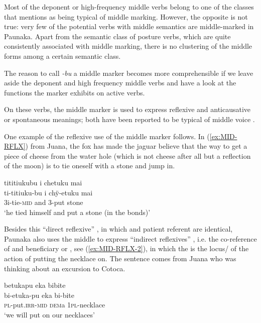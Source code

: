 Most of the deponent or high-frequency middle verbs belong to one of the classes that \citet[]{Kemmer1993} mentions as being typical of middle marking. However, the opposite is not true: very few of the potential verbs with middle semantics are middle-marked in Paunaka. Apart from the semantic class of posture verbs, which are quite consistently associated with middle marking, there is no clustering of the middle forms among a certain semantic class. 

The reason to call \textit{-bu} a middle marker becomes more comprehensible if we leave aside the deponent and high frequency middle verbs and have a look at the functions the marker exhibits on active  verbs.

On these verbs, the middle marker is used to express reflexive and anticausative or spontaneous meanings; both have been reported to be typical of middle voice \citep[cf.][1149--1150]{Shibatani2004}.

One example of the reflexive use of the middle marker follows. In (\ref{ex:MID-RFLX}) from Juana, the fox has made the jaguar believe that the way to get a piece of cheese from the water hole (which is not cheese after all but a reflection of the moon) is to tie oneself with a stone and jump in.

\ea\label{ex:MID-RFLX}
\begingl 
\glpreamble tititiukubu i chetuku mai\\
\gla ti-titiuku-bu i chÿ-etuku mai\\ 
\glb 3i-tie-\textsc{mid} and 3-put stone\\ 
\glft ‘he tied himself and put a stone (in the bonds)’\\ 
\endgl
 \trailingcitation{[jmx-n120429ls-x5.258-259]}
\xe

Besides this “direct reflexive” \citep[42]{Kemmer1993}, in which  and patient referent are identical, Paunaka also uses the middle to express “indirect reflexives” \citep[74]{Kemmer1993}, i.e. the co-reference of  and beneficiary or , see (\ref{ex:MID-RFLX-2}), in which the  is the locus/ of the action of putting the necklace on. The sentence comes from Juana who was thinking about an excursion to Cotoca.

\ea\label{ex:MID-RFLX-2}
\begingl 
\glpreamble betukapu eka bibite\\
\gla bi-etuka-pu eka bi-bite\\ 
\textsc{pl}-put.\textsc{irr}-\textsc{mid} \textsc{dem}a 1\textsc{pl}-necklace\\ 
\glft ‘we will put on our necklaces’\\ 
\endgl
 \trailingcitation{[jxx-p120430l-2.608]}
\xe

